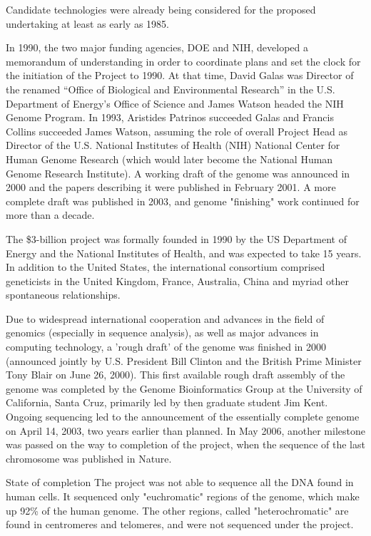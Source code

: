 \documentclass[12pt]{article}
\begin{document}
Candidate technologies were already being considered for the proposed undertaking at least as early as 1985.

In 1990, the two major funding agencies, DOE and NIH, developed a memorandum of understanding in order to coordinate plans and set the clock for the initiation of the Project to 1990. At that time, David Galas was Director of the renamed “Office of Biological and Environmental Research” in the U.S. Department of Energy’s Office of Science and James Watson headed the NIH Genome Program. In 1993, Aristides Patrinos succeeded Galas and Francis Collins succeeded James Watson, assuming the role of overall Project Head as Director of the U.S. National Institutes of Health (NIH) National Center for Human Genome Research (which would later become the National Human Genome Research Institute). A working draft of the genome was announced in 2000 and the papers describing it were published in February 2001. A more complete draft was published in 2003, and genome "finishing" work continued for more than a decade.

The \$3-billion project was formally founded in 1990 by the US Department of Energy and the National Institutes of Health, and was expected to take 15 years. In addition to the United States, the international consortium comprised geneticists in the United Kingdom, France, Australia, China and myriad other spontaneous relationships.

Due to widespread international cooperation and advances in the field of genomics (especially in sequence analysis), as well as major advances in computing technology, a 'rough draft' of the genome was finished in 2000 (announced jointly by U.S. President Bill Clinton and the British Prime Minister Tony Blair on June 26, 2000). This first available rough draft assembly of the genome was completed by the Genome Bioinformatics Group at the University of California, Santa Cruz, primarily led by then graduate student Jim Kent. Ongoing sequencing led to the announcement of the essentially complete genome on April 14, 2003, two years earlier than planned. In May 2006, another milestone was passed on the way to completion of the project, when the sequence of the last chromosome was published in Nature.

State of completion
The project was not able to sequence all the DNA found in human cells. It sequenced only "euchromatic" regions of the genome, which make up 92\% of the human genome. The other regions, called "heterochromatic" are found in centromeres and telomeres, and were not sequenced under the project.
\end{document}
